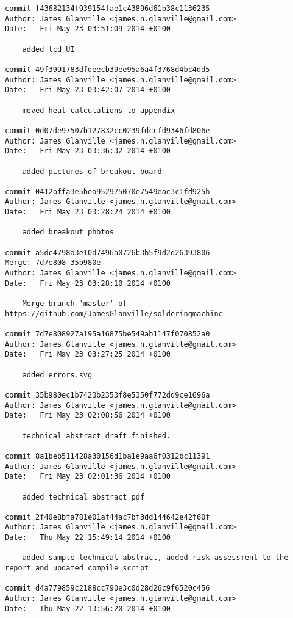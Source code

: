 \documentclass[a4paper,11pt]{article}  %
\begin{document}
\begin{lstlisting}[frame=single]
commit f43682134f939154fae1c43896d61b38c1136235
Author: James Glanville <james.n.glanville@gmail.com>
Date:   Fri May 23 03:51:09 2014 +0100

    added lcd UI

commit 49f3991783dfdeecb39ee95a6a4f3768d4bc4dd5
Author: James Glanville <james.n.glanville@gmail.com>
Date:   Fri May 23 03:42:07 2014 +0100

    moved heat calculations to appendix

commit 0d07de97507b127832cc0239fdccfd9346fd806e
Author: James Glanville <james.n.glanville@gmail.com>
Date:   Fri May 23 03:36:32 2014 +0100

    added pictures of breakout board

commit 0412bffa3e5bea952975070e7549eac3c1fd925b
Author: James Glanville <james.n.glanville@gmail.com>
Date:   Fri May 23 03:28:24 2014 +0100

    added breakout photos

commit a5dc4798a3e10d7496a0726b3b5f9d2d26393806
Merge: 7d7e808 35b980e
Author: James Glanville <james.n.glanville@gmail.com>
Date:   Fri May 23 03:28:10 2014 +0100

    Merge branch 'master' of https://github.com/JamesGlanville/solderingmachine

commit 7d7e808927a195a16875be549ab1147f070852a0
Author: James Glanville <james.n.glanville@gmail.com>
Date:   Fri May 23 03:27:25 2014 +0100

    added errors.svg

commit 35b980ec1b7423b2353f8e5350f772dd9ce1696a
Author: James Glanville <james.n.glanville@gmail.com>
Date:   Fri May 23 02:08:56 2014 +0100

    technical abstract draft finished.

commit 8a1beb511428a30156d1ba1e9aa6f0312bc11391
Author: James Glanville <james.n.glanville@gmail.com>
Date:   Fri May 23 02:01:36 2014 +0100

    added technical abstract pdf

commit 2f40e8bfa781e01af44ac7bf3dd144642e42f60f
Author: James Glanville <james.n.glanville@gmail.com>
Date:   Thu May 22 15:49:14 2014 +0100

    added sample technical abstract, added risk assessment to the report and updated compile script

commit d4a779859c2188cc790e3c0d28d26c9f6520c456
Author: James Glanville <james.n.glanville@gmail.com>
Date:   Thu May 22 13:56:20 2014 +0100


\end{lstlisting}
\end{document}
